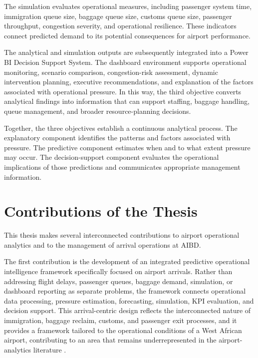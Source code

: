 The simulation evaluates operational measures, including passenger system time, immigration queue size, baggage queue size, customs queue size, passenger throughput, congestion severity, and operational resilience. These indicators connect predicted demand to its potential consequences for airport performance.

The analytical and simulation outputs are subsequently integrated into a Power BI Decision Support System. The dashboard environment supports operational monitoring, scenario comparison, congestion-risk assessment, dynamic intervention planning, executive recommendations, and explanation of the factors associated with operational pressure. In this way, the third objective converts analytical findings into information that can support staffing, baggage handling, queue management, and broader resource-planning decisions.

Together, the three objectives establish a continuous analytical process. The explanatory component identifies the patterns and factors associated with pressure. The predictive component estimates when and to what extent pressure may occur. The decision-support component evaluates the operational implications of those predictions and communicates appropriate management information.

\section{Contributions of the Thesis}
\label{sec:contributions-thesis}

This thesis makes several interconnected contributions to airport operational analytics and to the management of arrival operations at AIBD.

The first contribution is the development of an integrated predictive operational intelligence framework specifically focused on airport arrivals. Rather than addressing flight delays, passenger queues, baggage demand, simulation, or dashboard reporting as separate problems, the framework connects operational data processing, pressure estimation, forecasting, simulation, KPI evaluation, and decision support. This arrival-centric design reflects the interconnected nature of immigration, baggage reclaim, customs, and passenger exit processes, and it provides a framework tailored to the operational conditions of a West African airport, contributing to an area that remains underrepresented in the airport-analytics literature \parencite{orsini2019neural,shao2022predicting,pang2024machine,cao2025robust,sang2026integrating}.

